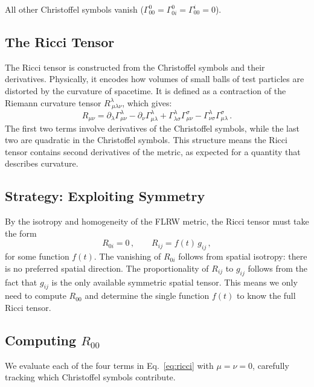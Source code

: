 All other Christoffel symbols vanish ($\Gamma^0_{00}=\Gamma^0_{0i}=\Gamma^i_{00}=0$).

\subsection{The Ricci Tensor}

The Ricci tensor is constructed from the Christoffel symbols and their derivatives. Physically, it encodes how volumes of small balls of test particles are distorted by the curvature of spacetime. It is defined as a contraction of the Riemann curvature tensor $R^\lambda_{\ \mu\lambda\nu}$, which gives:
\begin{equation}\label{eq:ricci}
    R_{\mu\nu} = \partial_\lambda\Gamma^\lambda_{\mu\nu} - \partial_\nu\Gamma^\lambda_{\mu\lambda} + \Gamma^\lambda_{\lambda\sigma}\Gamma^\sigma_{\mu\nu} - \Gamma^\lambda_{\nu\sigma}\Gamma^\sigma_{\mu\lambda}\,.
\end{equation}
The first two terms involve derivatives of the Christoffel symbols, while the last two are quadratic in the Christoffel symbols. This structure means the Ricci tensor contains second derivatives of the metric, as expected for a quantity that describes curvature.

\subsection*{Strategy: Exploiting Symmetry}

By the isotropy and homogeneity of the FLRW metric, the Ricci tensor must take the form
\begin{equation}
    R_{0i} = 0\,,\qquad R_{ij} = f(t)\,g_{ij}\,,
\end{equation}
for some function $f(t)$. The vanishing of $R_{0i}$ follows from spatial isotropy: there is no preferred spatial direction. The proportionality of $R_{ij}$ to $g_{ij}$ follows from the fact that $g_{ij}$ is the only available symmetric spatial tensor. This means we only need to compute $R_{00}$ and determine the single function $f(t)$ to know the full Ricci tensor.

\subsection*{Computing $R_{00}$}

We evaluate each of the four terms in Eq.~\eqref{eq:ricci} with $\mu=\nu=0$, carefully tracking which Christoffel symbols contribute.


